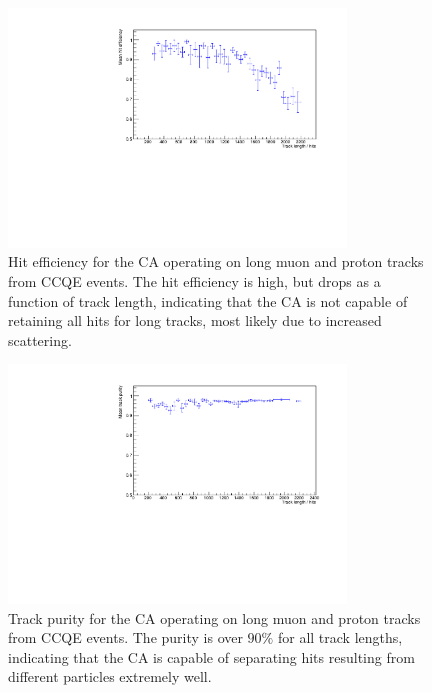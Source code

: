 \begin{figure}
    \centering
    \includegraphics[angle=-90,width=0.8\textwidth]{chapters/cellularautomaton_images/ccqe-reduced-hit-efficiency}
    \caption[Hit efficiency for CA operating on long muon and proton tracks]{\label{fig:ca-ccqe-reduced-eff-pur-efficiency}Hit efficiency for the \ac{CA} operating on long muon and proton tracks from CCQE events. The hit efficiency is high, but drops as a function of track length, indicating that the \ac{CA} is not capable of retaining all hits for long tracks, most likely due to increased scattering.}
\end{figure}

\begin{figure}
    \centering
    \includegraphics[angle=-90,width=0.8\textwidth]{chapters/cellularautomaton_images/ccqe-reduced-cluster-purity}
    \caption[Track purity for CA operating on long muon and proton tracks]{\label{fig:ca-ccqe-reduced-eff-pur-purity}Track purity for the \ac{CA} operating on long muon and proton tracks from CCQE events. The purity is over $90\%$ for all track lengths, indicating that the \ac{CA} is capable of separating hits resulting from different particles extremely well.}
\end{figure}

